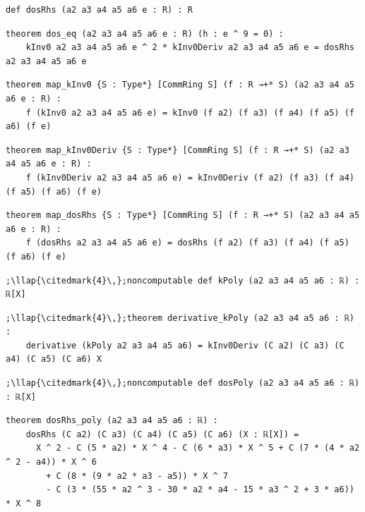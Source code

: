 \begin{lstlisting}[style=leancat]
def dosRhs (a2 a3 a4 a5 a6 e : R) : R
\end{lstlisting}

\begin{lstlisting}[style=leancat]
theorem dos_eq (a2 a3 a4 a5 a6 e : R) (h : e ^ 9 = 0) :
    kInv0 a2 a3 a4 a5 a6 e ^ 2 * kInv0Deriv a2 a3 a4 a5 a6 e = dosRhs a2 a3 a4 a5 a6 e
\end{lstlisting}

\begin{lstlisting}[style=leancat]
theorem map_kInv0 {S : Type*} [CommRing S] (f : R →+* S) (a2 a3 a4 a5 a6 e : R) :
    f (kInv0 a2 a3 a4 a5 a6 e) = kInv0 (f a2) (f a3) (f a4) (f a5) (f a6) (f e)
\end{lstlisting}

\begin{lstlisting}[style=leancat]
theorem map_kInv0Deriv {S : Type*} [CommRing S] (f : R →+* S) (a2 a3 a4 a5 a6 e : R) :
    f (kInv0Deriv a2 a3 a4 a5 a6 e) = kInv0Deriv (f a2) (f a3) (f a4) (f a5) (f a6) (f e)
\end{lstlisting}

\begin{lstlisting}[style=leancat]
theorem map_dosRhs {S : Type*} [CommRing S] (f : R →+* S) (a2 a3 a4 a5 a6 e : R) :
    f (dosRhs a2 a3 a4 a5 a6 e) = dosRhs (f a2) (f a3) (f a4) (f a5) (f a6) (f e)
\end{lstlisting}

\begin{lstlisting}[style=leancat]
;\llap{\citedmark{4}\,};noncomputable def kPoly (a2 a3 a4 a5 a6 : ℝ) : ℝ[X]
\end{lstlisting}

\begin{lstlisting}[style=leancat]
;\llap{\citedmark{4}\,};theorem derivative_kPoly (a2 a3 a4 a5 a6 : ℝ) :
    derivative (kPoly a2 a3 a4 a5 a6) = kInv0Deriv (C a2) (C a3) (C a4) (C a5) (C a6) X
\end{lstlisting}

\begin{lstlisting}[style=leancat]
;\llap{\citedmark{4}\,};noncomputable def dosPoly (a2 a3 a4 a5 a6 : ℝ) : ℝ[X]
\end{lstlisting}

\begin{lstlisting}[style=leancat]
theorem dosRhs_poly (a2 a3 a4 a5 a6 : ℝ) :
    dosRhs (C a2) (C a3) (C a4) (C a5) (C a6) (X : ℝ[X]) =
      X ^ 2 - C (5 * a2) * X ^ 4 - C (6 * a3) * X ^ 5 + C (7 * (4 * a2 ^ 2 - a4)) * X ^ 6
        + C (8 * (9 * a2 * a3 - a5)) * X ^ 7
        - C (3 * (55 * a2 ^ 3 - 30 * a2 * a4 - 15 * a3 ^ 2 + 3 * a6)) * X ^ 8
\end{lstlisting}

